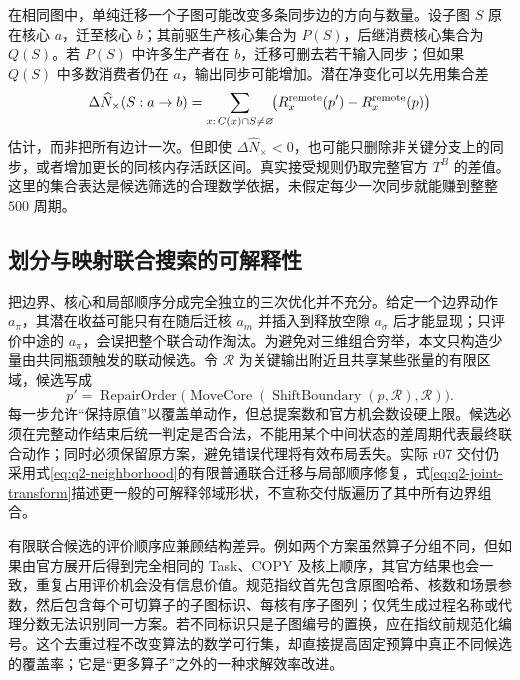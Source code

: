 在相同图中，单纯迁移一个子图可能改变多条同步边的方向与数量。设子图 $S$ 原在核心 $a$，迁至核心 $b$；其前驱生产核心集合为 $P(S)$，后继消费核心集合为 $Q(S)$。若 $P(S)$ 中许多生产者在 $b$，迁移可删去若干输入同步；但如果 $Q(S)$ 中多数消费者仍在 $a$，输出同步可能增加。潜在净变化可以先用集合差
\begin{equation}\label{eq:q2-sync-proxy}
\Delta\widehat N_{\times}(S:a\to b)=
\sum_{x:\,C(x)\cap S\ne\varnothing}\!
\bigl(R_x^{\rm remote}(p')-R_x^{\rm remote}(p)\bigr)
\end{equation}
估计，而非把所有边计一次。但即使 $\Delta\widehat N_{\times}<0$，也可能只删除非关键分支上的同步，或者增加更长的同核内存活跃区间。真实接受规则仍取完整官方 $T^B$ 的差值。这里的集合表达是候选筛选的合理数学依据，未假定每少一次同步就能赚到整整 $500$ 周期。

\subsection{划分与映射联合搜索的可解释性}
把边界、核心和局部顺序分成完全独立的三次优化并不充分。给定一个边界动作 $a_\pi$，其潜在收益可能只有在随后迁核 $a_m$ 并插入到释放空隙 $a_\sigma$ 后才能显现；只评价中途的 $a_\pi$，会误把整个联合动作淘汰。为避免对三维组合穷举，本文只构造少量由共同瓶颈触发的联动候选。令 $\mathcal R$ 为关键输出附近且共享某些张量的有限区域，候选写成
\begin{equation}\label{eq:q2-joint-transform}
p'=\operatorname{RepairOrder}
\bigl(\operatorname{MoveCore}(\operatorname{ShiftBoundary}(p,\mathcal R),\mathcal R)\bigr).
\end{equation}
每一步允许“保持原值”以覆盖单动作，但总提案数和官方机会数设硬上限。候选必须在完整动作结束后统一判定是否合法，不能用某个中间状态的差周期代表最终联合动作；同时必须保留原方案，避免错误代理将有效布局丢失。实际 r07 交付仍采用式\eqref{eq:q2-neighborhood}的有限普通联合迁移与局部顺序修复，式\eqref{eq:q2-joint-transform}描述更一般的可解释邻域形状，不宣称交付版遍历了其中所有边界组合。

有限联合候选的评价顺序应兼顾结构差异。例如两个方案虽然算子分组不同，但如果由官方展开后得到完全相同的 Task、COPY 及核上顺序，其官方结果也会一致，重复占用评价机会没有信息价值。规范指纹首先包含原图哈希、核数和场景参数，然后包含每个可切算子的子图标识、每核有序子图列；仅凭生成过程名称或代理分数无法识别同一方案。若不同标识只是子图编号的置换，应在指纹前规范化编号。这个去重过程不改变算法的数学可行集，却直接提高固定预算中真正不同候选的覆盖率；它是“更多算子”之外的一种求解效率改进。

